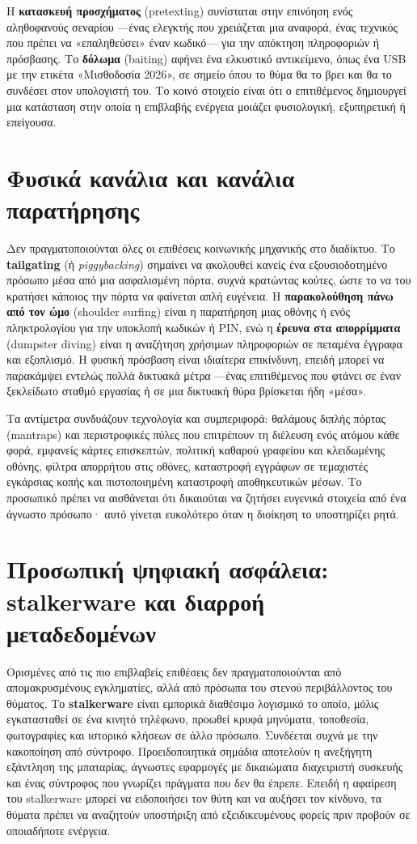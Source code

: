 Η \textbf{κατασκευή προσχήματος} (pretexting) συνίσταται στην επινόηση ενός αληθοφανούς σεναρίου —ένας ελεγκτής που χρειάζεται μια αναφορά, ένας τεχνικός που πρέπει να «επαληθεύσει» έναν κωδικό— για την απόκτηση πληροφοριών ή πρόσβασης. Το \textbf{δόλωμα} (baiting) αφήνει ένα ελκυστικό αντικείμενο, όπως ένα USB με την ετικέτα «Μισθοδοσία 2026», σε σημείο όπου το θύμα θα το βρει και θα το συνδέσει στον υπολογιστή του. Το κοινό στοιχείο είναι ότι ο επιτιθέμενος δημιουργεί μια κατάσταση στην οποία η επιβλαβής ενέργεια μοιάζει φυσιολογική, εξυπηρετική ή επείγουσα.

\section{Φυσικά κανάλια και κανάλια παρατήρησης}\label{sec:5.3}
Δεν πραγματοποιούνται όλες οι επιθέσεις κοινωνικής μηχανικής στο διαδίκτυο. Το \textbf{tailgating} (ή \emph{piggybacking}) σημαίνει να ακολουθεί κανείς ένα εξουσιοδοτημένο πρόσωπο μέσα από μια ασφαλισμένη πόρτα, συχνά κρατώντας κούτες, ώστε το να του κρατήσει κάποιος την πόρτα να φαίνεται απλή ευγένεια. Η \textbf{παρακολούθηση πάνω από τον ώμο} (shoulder surfing) είναι η παρατήρηση μιας οθόνης ή ενός πληκτρολογίου για την υποκλοπή κωδικών ή PIN, ενώ η \textbf{έρευνα στα απορρίμματα} (dumpster diving) είναι η αναζήτηση χρήσιμων πληροφοριών σε πεταμένα έγγραφα και εξοπλισμό. Η φυσική πρόσβαση είναι ιδιαίτερα επικίνδυνη, επειδή μπορεί να παρακάμψει εντελώς πολλά δικτυακά μέτρα —ένας επιτιθέμενος που φτάνει σε έναν ξεκλείδωτο σταθμό εργασίας ή σε μια δικτυακή θύρα βρίσκεται ήδη «μέσα».

Τα αντίμετρα συνδυάζουν τεχνολογία και συμπεριφορά: θαλάμους διπλής πόρτας (mantraps) και περιστροφικές πύλες που επιτρέπουν τη διέλευση ενός ατόμου κάθε φορά, εμφανείς κάρτες επισκεπτών, πολιτική καθαρού γραφείου και κλειδωμένης οθόνης, φίλτρα απορρήτου στις οθόνες, καταστροφή εγγράφων σε τεμαχιστές εγκάρσιας κοπής και πιστοποιημένη καταστροφή αποθηκευτικών μέσων. Το προσωπικό πρέπει να αισθάνεται ότι δικαιούται να ζητήσει ευγενικά στοιχεία από ένα άγνωστο πρόσωπο· αυτό γίνεται ευκολότερο όταν η διοίκηση το υποστηρίζει ρητά.

\section{Προσωπική ψηφιακή ασφάλεια: stalkerware και διαρροή μεταδεδομένων}\label{sec:5.4}
Ορισμένες από τις πιο επιβλαβείς επιθέσεις δεν πραγματοποιούνται από απομακρυσμένους εγκληματίες, αλλά από πρόσωπα του στενού περιβάλλοντος του θύματος. Το \textbf{stalkerware} είναι εμπορικά διαθέσιμο λογισμικό το οποίο, μόλις εγκατασταθεί σε ένα κινητό τηλέφωνο, προωθεί κρυφά μηνύματα, τοποθεσία, φωτογραφίες και ιστορικό κλήσεων σε άλλο πρόσωπο. Συνδέεται συχνά με την κακοποίηση από σύντροφο. Προειδοποιητικά σημάδια αποτελούν η ανεξήγητη εξάντληση της μπαταρίας, άγνωστες εφαρμογές με δικαιώματα διαχειριστή συσκευής και ένας σύντροφος που γνωρίζει πράγματα που δεν θα έπρεπε. Επειδή η αφαίρεση του stalkerware μπορεί να ειδοποιήσει τον θύτη και να αυξήσει τον κίνδυνο, τα θύματα πρέπει να αναζητούν υποστήριξη από εξειδικευμένους φορείς πριν προβούν σε οποιαδήποτε ενέργεια.

